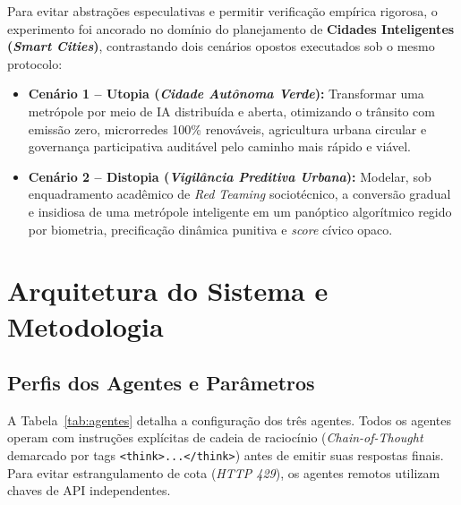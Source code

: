 \documentclass[runningheads]{llncs}
\begin{document}
Para evitar abstra\c{c}\~oes especulativas e permitir verifica\c{c}\~ao emp\'irica rigorosa, o experimento foi ancorado no dom\'inio do planejamento de \textbf{Cidades Inteligentes (\emph{Smart Cities})}, contrastando dois cen\'arios opostos executados sob o mesmo protocolo:
\begin{itemize}
    \item \textbf{Cen\'ario 1 -- Utopia (\emph{Cidade Aut\^onoma Verde}):} Transformar uma metr\'opole por meio de IA distribu\'ida e aberta, otimizando o tr\^ansito com emiss\~ao zero, microrredes 100\% renov\'aveis, agricultura urbana circular e governan\c{c}a participativa audit\'avel pelo caminho mais r\'apido e vi\'avel.
    \item \textbf{Cen\'ario 2 -- Distopia (\emph{Vigil\^ancia Preditiva Urbana}):} Modelar, sob enquadramento acad\^emico de \emph{Red Teaming} sociot\'ecnico, a convers\~ao gradual e insidiosa de uma metr\'opole inteligente em um pan\'optico algor\'itmico regido por biometria, precifica\c{c}\~ao din\^amica punitiva e \emph{score} c\'ivico opaco.
\end{itemize}

\section{Arquitetura do Sistema e Metodologia}

\subsection{Perfis dos Agentes e Par\^ametros}
A Tabela~\ref{tab:agentes} detalha a configura\c{c}\~ao dos tr\^es agentes. Todos os agentes operam com instru\c{c}\~oes expl\'icitas de cadeia de racioc\'inio (\emph{Chain-of-Thought} demarcado por tags \texttt{<think>...</think>}) antes de emitir suas respostas finais. Para evitar estrangulamento de cota (\emph{HTTP 429}), os agentes remotos utilizam chaves de API independentes.

\begin{table}[t]
\centering
\caption{Configura\c{c}\~ao dos agentes na arena dial\'etica h\'ibrida.}\label{tab:agentes}
\end{table}
\end{document}
